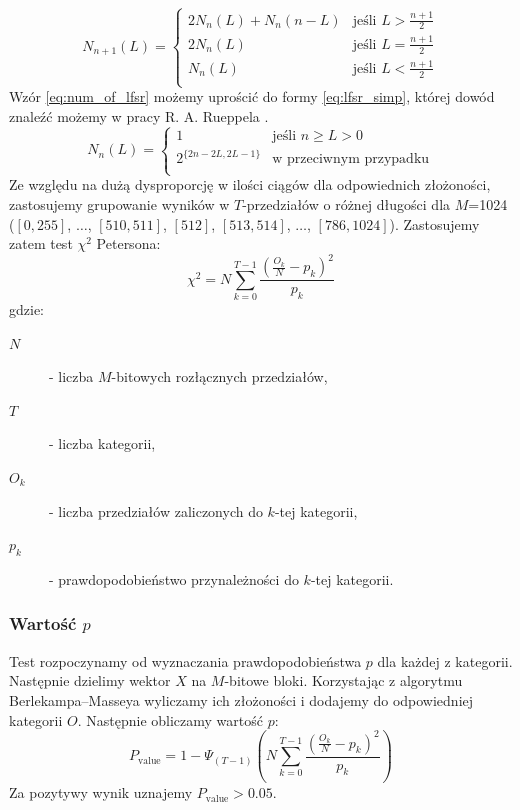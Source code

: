 \begin{equation}
\label{eq:num_of_lfsr}
    N_{n+1}(L) = \begin{cases} 
    2N_{n}(L)+N_{n}(n-L) & \textrm{jeśli } L > \frac{n+1}{2}\\
    2N_{n}(L) & \textrm{jeśli } L = \frac{n+1}{2}\\
    N_{n}(L)  & \textrm{jeśli } L < \frac{n+1}{2}\\
    \end{cases}
\end{equation}
Wzór \ref{eq:num_of_lfsr} możemy uprościć do formy \ref{eq:lfsr_simp}, której dowód znaleźć możemy w pracy R. A. Rueppela \cite{expected_lfsr}.
\begin{equation}
\label{eq:lfsr_simp}
    N_{n}(L) = \begin{cases} 
    1 & \textrm{jeśli } n \geq L > 0\\
    2^{\{2n-2L, 2L - 1\}} & \textrm{w przeciwnym przypadku}\\
    \end{cases}
\end{equation}
 Ze względu na dużą dysproporcję w ilości ciągów dla odpowiednich złożoności, zastosujemy grupowanie wyników w $T$-przedziałów o różnej długości dla $M$=1024 ($[0, 255]$, $\dots$, $[510, 511]$, $[512]$, $[513, 514]$, $\dots$, $[786, 1024]$). Zastosujemy zatem test $\chi^2$ Petersona:
\begin{equation}
    \chi^2 = N\sum_{k=0}^{T-1}{\frac{(\frac{O_k}{N}-p_k)^2}{p_k}}
\end{equation}
gdzie:
\begin{description}
    \item[$N$] - liczba $M$-bitowych rozłącznych przedziałów,
    \item[$T$] - liczba kategorii,
    \item[$O_k$] - liczba przedziałów zaliczonych do $k$-tej kategorii,
    \item[$p_k$] - prawdopodobieństwo przynależności do $k$-tej kategorii.
\end{description}
\subsubsection{Wartość $p$}
Test rozpoczynamy od wyznaczania prawdopodobieństwa $p$ dla każdej z kategorii. Następnie dzielimy wektor $X$ na $M$-bitowe bloki. Korzystając z algorytmu Berlekampa–Masseya wyliczamy ich złożoności i dodajemy do odpowiedniej kategorii $O$. Następnie obliczamy wartość $p$:
\begin{equation}
    P_{\textrm{value}} =  1-\Psi_{(T-1)}\left(N\sum_{k=0}^{T-1}{\frac{(\frac{O_k}{N}-p_k)^2}{p_k}}\right)
\end{equation}
Za pozytywy wynik uznajemy $P_{\textrm{value}} > 0.05$.
